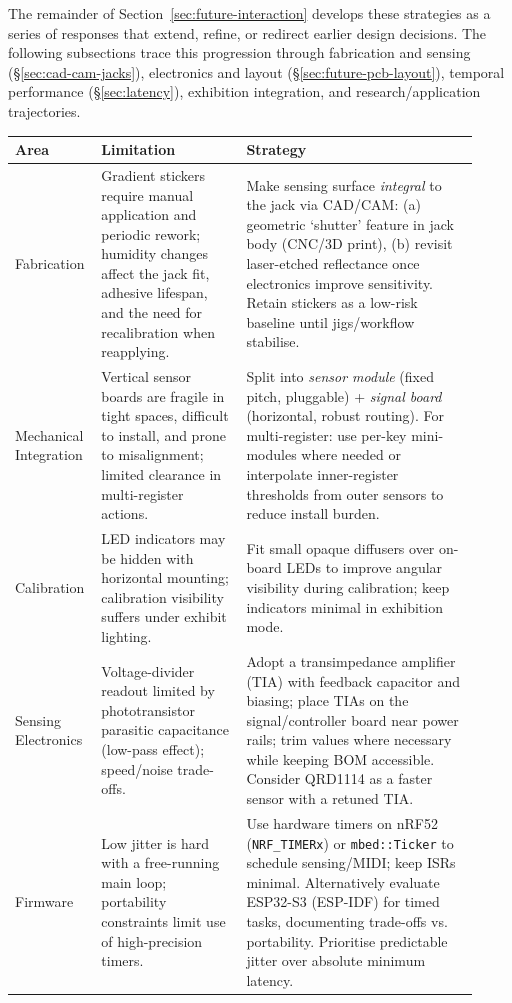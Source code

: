 The remainder of Section~\ref{sec:future-interaction} develops these strategies as a series of responses that extend, refine, or redirect earlier design decisions. The following subsections trace this progression through fabrication and sensing (\S\ref{sec:cad-cam-jacks}), electronics and layout (\S\ref{sec:future-pcb-layout}), temporal performance (\S\ref{sec:latency}), exhibition integration, and research/application trajectories.


\begin{table}
\centering
\small
\begin{tabular}{>{\raggedright\arraybackslash}p{0.14\linewidth} >{\raggedright\arraybackslash}p{0.30\linewidth} >{\raggedright\arraybackslash}p{0.48\linewidth}}
\toprule
\textbf{Area} & \textbf{Limitation } & \textbf{Strategy} \\
\midrule
Fabrication 
&
Gradient stickers require manual application and periodic rework; humidity changes affect the jack fit, adhesive lifespan, and the need for recalibration when reapplying.
&
Make sensing surface \emph{integral} to the jack via CAD/CAM: (a) geometric `shutter' feature in jack body (CNC/3D print), (b) revisit laser-etched reflectance once electronics improve sensitivity. Retain stickers as a low-risk baseline until jigs/workflow stabilise. \\
\addlinespace
Mechanical Integration
&
Vertical sensor boards are fragile in tight spaces, difficult to install, and prone to misalignment; limited clearance in multi-register actions.
&
Split into \emph{sensor module} (fixed pitch, pluggable) + \emph{signal board} (horizontal, robust routing). For multi-register: use per-key mini-modules where needed or interpolate inner-register thresholds from outer sensors to reduce install burden. \\
\addlinespace
Calibration
&
LED indicators may be hidden with horizontal mounting; calibration visibility suffers under exhibit lighting.
&
Fit small opaque diffusers over on-board LEDs to improve angular visibility during calibration; keep indicators minimal in exhibition mode. \\
\addlinespace
Sensing Electronics
&
Voltage-divider readout limited by phototransistor parasitic capacitance (low-pass effect); speed/noise trade-offs.
&
Adopt a transimpedance amplifier (TIA) with feedback capacitor and biasing; place TIAs on the signal/controller board near power rails; trim values where necessary while keeping BOM accessible. Consider QRD1114 as a faster sensor with a retuned TIA. \\
\addlinespace
Firmware
&
Low jitter is hard with a free-running main loop; portability constraints limit use of high-precision timers.
&
Use hardware timers on nRF52 (\texttt{NRF\_TIMERx}) or \texttt{mbed::Ticker} to schedule sensing/MIDI; keep ISRs minimal. Alternatively evaluate ESP32-S3 (ESP-IDF) for timed tasks, documenting trade-offs vs. portability. Prioritise predictable jitter over absolute minimum latency. \\
\bottomrule
\end{tabular}
\end{table}

